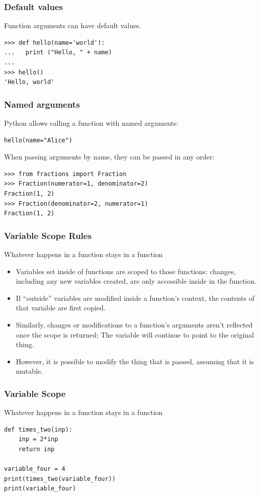 \begin{frame}[fragile]\frametitle{Default values}

  Function arguments can have default values.
\begin{lstlisting}
>>> def hello(name='world'):
...   print ("Hello, " + name)
...
>>> hello()
'Hello, world'
\end{lstlisting}
\end{frame}

\begin{frame}[fragile]\frametitle{Named arguments}
Python allows calling a function with named arguments:
\begin{lstlisting}
hello(name="Alice")
\end{lstlisting}
When passing arguments by name, they can be passed in any order:
\begin{lstlisting}
>>> from fractions import Fraction
>>> Fraction(numerator=1, denominator=2)
Fraction(1, 2)
>>> Fraction(denominator=2, numerator=1)
Fraction(1, 2)
\end{lstlisting}
\end{frame}


\begin{frame}[fragile]\frametitle{Variable Scope Rules}
Whatever happens in a function stays in a function
    \begin{itemize}
    \item Variables set inside of functions are scoped to those functions: changes, including any new variables created, are only accessible inside in the function.
    \item If ``outside'' variables are modified inside a function's context, the contents of that variable are first copied.
	\item Similarly, changes or modifications to a function's arguments aren't reflected once the scope is returned; The variable will continue to point to the original thing. 
	\item However, it is possible to modify the thing that is passed, assuming that it is mutable.
    \end{itemize}
\end{frame}

\begin{frame}[fragile]\frametitle{Variable Scope}
Whatever happens in a function stays in a function
\begin{lstlisting}
def times_two(inp):
    inp = 2*inp
    return inp

variable_four = 4
print(times_two(variable_four))
print(variable_four)
\end{lstlisting}
\end{frame}



